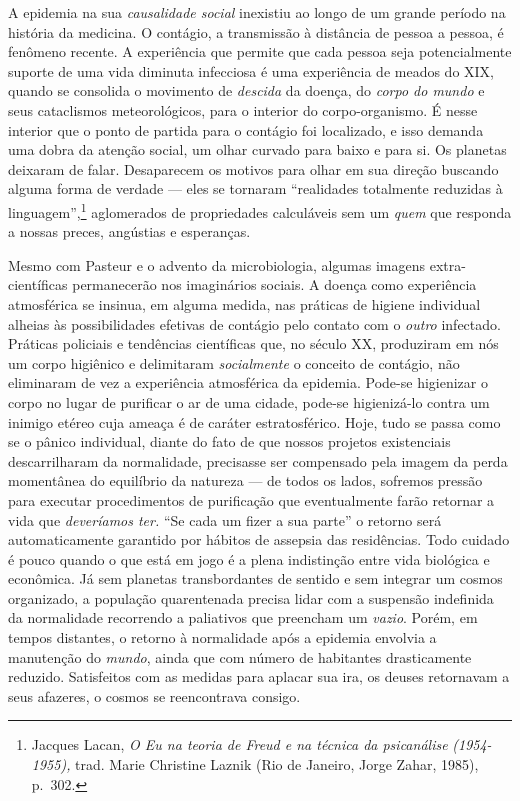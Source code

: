 A epidemia na sua \emph{causalidade social} inexistiu ao longo de um
grande período na história da medicina. O contágio, a transmissão à
distância de pessoa a pessoa, é fenômeno recente. A experiência que
permite que cada pessoa seja potencialmente suporte de uma vida diminuta
infecciosa é uma experiência de meados do XIX, quando se consolida o
movimento de \emph{descida} da doença, do \emph{corpo do mundo} e seus
cataclismos meteorológicos, para o interior do corpo-organismo. É nesse
interior que o ponto de partida para o contágio foi localizado, e isso
demanda uma dobra da atenção social, um olhar curvado para baixo e para
si. Os planetas deixaram de falar. Desaparecem os motivos para olhar em
sua direção buscando alguma forma de verdade --- eles se tornaram
``realidades totalmente reduzidas à linguagem'',\footnote{Jacques Lacan,
  \emph{O Eu na teoria de Freud e na técnica da psicanálise}
  \emph{(1954-1955),} trad. Marie Christine Laznik (Rio de Janeiro,
  Jorge Zahar, 1985), p.~302.} aglomerados de propriedades calculáveis
sem um \emph{quem} que responda a nossas preces, angústias e esperanças.

Mesmo com Pasteur e o advento da microbiologia, algumas imagens
extra-científicas permanecerão nos imaginários sociais. A doença como
experiência atmosférica se insinua, em alguma medida, nas práticas de
higiene individual alheias às possibilidades efetivas de contágio pelo
contato com o \emph{outro} infectado. Práticas policiais e tendências
científicas que, no século XX, produziram em nós um corpo higiênico e
delimitaram \emph{socialmente} o conceito de contágio, não eliminaram de
vez a experiência atmosférica da epidemia. Pode-se higienizar o corpo no
lugar de purificar o ar de uma cidade, pode-se higienizá-lo contra um
inimigo etéreo cuja ameaça é de caráter estratosférico. Hoje, tudo se
passa como se o pânico individual, diante do fato de que nossos projetos
existenciais descarrilharam da normalidade, precisasse ser compensado
pela imagem da perda momentânea do equilíbrio da natureza --- de todos
os lados, sofremos pressão para executar procedimentos de purificação
que eventualmente farão retornar a vida que \emph{deveríamos ter.} ``Se
cada um fizer a sua parte'' o retorno será automaticamente garantido por
hábitos de assepsia das residências. Todo cuidado é pouco quando o que
está em jogo é a plena indistinção entre vida biológica e econômica. Já
sem planetas transbordantes de sentido e sem integrar um cosmos
organizado, a população quarentenada precisa lidar com a suspensão
indefinida da normalidade recorrendo a paliativos que preencham um
\emph{vazio}. Porém, em tempos distantes, o retorno à normalidade após a
epidemia envolvia a manutenção do \emph{mundo}, ainda que com número de
habitantes drasticamente reduzido. Satisfeitos com as medidas para
aplacar sua ira, os deuses retornavam a seus afazeres, o cosmos se
reencontrava consigo.

